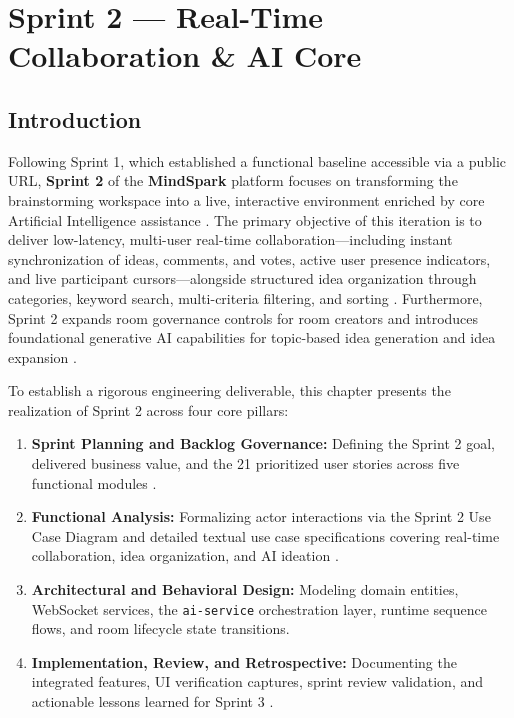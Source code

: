 \chapter{Sprint 2 — Real-Time Collaboration \& AI Core}
\label{chap:sprint2}

\section{Introduction}

Following Sprint 1, which established a functional baseline accessible via a public URL, \textbf{Sprint 2} of the \textbf{MindSpark} platform focuses on transforming the brainstorming workspace into a live, interactive environment enriched by core Artificial Intelligence assistance \cite{backlog}. The primary objective of this iteration is to deliver low-latency, multi-user real-time collaboration—including instant synchronization of ideas, comments, and votes, active user presence indicators, and live participant cursors—alongside structured idea organization through categories, keyword search, multi-criteria filtering, and sorting \cite{backlog}. Furthermore, Sprint 2 expands room governance controls for room creators and introduces foundational generative AI capabilities for topic-based idea generation and idea expansion \cite{backlog}.

To establish a rigorous engineering deliverable, this chapter presents the realization of Sprint 2 across four core pillars:
\begin{enumerate}
    \item \textbf{Sprint Planning and Backlog Governance:} Defining the Sprint 2 goal, delivered business value, and the 21 prioritized user stories across five functional modules \cite{backlog}.
    \item \textbf{Functional Analysis:} Formalizing actor interactions via the Sprint 2 Use Case Diagram and detailed textual use case specifications covering real-time collaboration, idea organization, and AI ideation \cite{backlog}.
    \item \textbf{Architectural and Behavioral Design:} Modeling domain entities, WebSocket services, the \texttt{ai-service} orchestration layer, runtime sequence flows, and room lifecycle state transitions.
    \item \textbf{Implementation, Review, and Retrospective:} Documenting the integrated features, UI verification captures, sprint review validation, and actionable lessons learned for Sprint 3 \cite{backlog}.
\end{enumerate}

